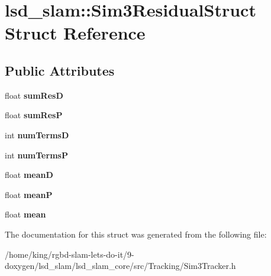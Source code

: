 \hypertarget{structlsd__slam_1_1_sim3_residual_struct}{\section{lsd\-\_\-slam\-:\-:Sim3\-Residual\-Struct Struct Reference}
\label{structlsd__slam_1_1_sim3_residual_struct}
}
\subsection*{Public Attributes}
\begin{DoxyCompactItemize}
\item 
\hypertarget{structlsd__slam_1_1_sim3_residual_struct_afffe2709d02b54c04f9b2d4a82aa87ee}{float {\bfseries sum\-Res\-D}}\label{structlsd__slam_1_1_sim3_residual_struct_afffe2709d02b54c04f9b2d4a82aa87ee}

\item 
\hypertarget{structlsd__slam_1_1_sim3_residual_struct_ad2dcdc9beb717a4fa2038e7a24c41f54}{float {\bfseries sum\-Res\-P}}\label{structlsd__slam_1_1_sim3_residual_struct_ad2dcdc9beb717a4fa2038e7a24c41f54}

\item 
\hypertarget{structlsd__slam_1_1_sim3_residual_struct_a06acb1e7b1c3ab0ab3b8d91e86a3cd67}{int {\bfseries num\-Terms\-D}}\label{structlsd__slam_1_1_sim3_residual_struct_a06acb1e7b1c3ab0ab3b8d91e86a3cd67}

\item 
\hypertarget{structlsd__slam_1_1_sim3_residual_struct_a3d631432555dec6119cd963a2cecde75}{int {\bfseries num\-Terms\-P}}\label{structlsd__slam_1_1_sim3_residual_struct_a3d631432555dec6119cd963a2cecde75}

\item 
\hypertarget{structlsd__slam_1_1_sim3_residual_struct_ad44eb4ddc70393e2a3894870b6be0692}{float {\bfseries mean\-D}}\label{structlsd__slam_1_1_sim3_residual_struct_ad44eb4ddc70393e2a3894870b6be0692}

\item 
\hypertarget{structlsd__slam_1_1_sim3_residual_struct_a64182b720402ee5c9bf377159116580d}{float {\bfseries mean\-P}}\label{structlsd__slam_1_1_sim3_residual_struct_a64182b720402ee5c9bf377159116580d}

\item 
\hypertarget{structlsd__slam_1_1_sim3_residual_struct_a1eb976c5efa91d6be16766fc8c7894fe}{float {\bfseries mean}}\label{structlsd__slam_1_1_sim3_residual_struct_a1eb976c5efa91d6be16766fc8c7894fe}

\end{DoxyCompactItemize}


The documentation for this struct was generated from the following file\-:\begin{DoxyCompactItemize}
\item 
/home/king/rgbd-\/slam-\/lets-\/do-\/it/9-\/doxygen/lsd\-\_\-slam/lsd\-\_\-slam\-\_\-core/src/\-Tracking/Sim3\-Tracker.\-h\end{DoxyCompactItemize}
